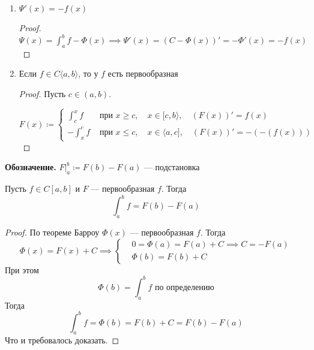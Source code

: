 \begin{follow}
  \begin{enumerate}
    \item $\Psi'(x) = -f(x)$
      \begin{proof}
          $\displaystyle\Psi(x) = \int_{a}^{b}f - \Phi(x) \implies \Psi'(x) = (C - \Phi(x))' = -\Phi'(x) = -f(x)$
      \end{proof}
    \item Если $f \in C\langle a, b \rangle$, то у $f$ есть первообразная
      \begin{proof}
          Пусть $c \in (a, b)$.

          \begin{equation*}
              F(x) \coloneqq
              \begin{cases}
                  \displaystyle
                  \int_{c}^{x} f & \text{ при $x \geq c$}, \quad x \in [c, b\rangle, \quad (F(x))' = f(x)\\
                  \displaystyle
                  -\int_{x}^{c} f & \text{ при $x \leq c$}, \quad x \in \langle a, c], \quad (F(x))' = -(-(f(x)))
              \end{cases}
          \end{equation*}
      \end{proof}
  \end{enumerate}
\end{follow}

\textbf{Обозначение.}
$F \big|_{a}^{b} \coloneqq F(b) - F(a)$ --- подстановка

\begin{theorem}
    Пусть $f \in C[a, b]$ и $F$ --- первообразная $f$. Тогда
    \begin{equation*}
        \int_{a}^{b} f = F(b) - F(a)
    \end{equation*}
\end{theorem}

\begin{proof}
    По теореме Барроу $\Phi(x)$ --- первообразная $f$. Тогда
    \begin{equation*}
      \Phi(x) = F(x) + C \implies
      \begin{cases}
        &0 = \Phi(a) = F(a) + C \implies C = -F(a) \\
        &\Phi(b) = F(b) + C
      \end{cases}
    \end{equation*}
    При этом
    \begin{equation*}
      \Phi(b) = \int_{a}^{b} f
      \text{ по определению}
    \end{equation*}
    Тогда
    \begin{equation*}
      \int_{a}^{b} f = \Phi(b) = F(b) + C = F(b) - F(a)
    \end{equation*}
    Что и требовалось доказать.
\end{proof}